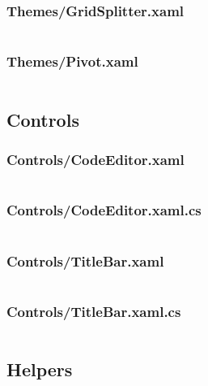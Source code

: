 \documentclass[a4paper]{report}
\begin{document}
\inputminted{xml}{"../src/Algorithm Dynamics/Themes/FlyoutPresenter.xaml"}

\subsubsection{Themes/GridSplitter.xaml}

\inputminted{xml}{"../src/Algorithm Dynamics/Themes/GridSplitter.xaml"}

\subsubsection{Themes/Pivot.xaml}

\inputminted{xml}{"../src/Algorithm Dynamics/Themes/Pivot.xaml"}

\subsection{Controls}

\subsubsection{Controls/CodeEditor.xaml}

\inputminted{xml}{"../src/Algorithm Dynamics/Controls/CodeEditor.xaml"}

\subsubsection{Controls/CodeEditor.xaml.cs}

\inputminted{csharp}{"../src/Algorithm Dynamics/Controls/CodeEditor.xaml.cs"}

\subsubsection{Controls/TitleBar.xaml}

\inputminted{xml}{"../src/Algorithm Dynamics/Controls/TitleBar.xaml"}

\subsubsection{Controls/TitleBar.xaml.cs}

\inputminted{csharp}{"../src/Algorithm Dynamics/Controls/TitleBar.xaml.cs"}

\subsection{Helpers}
\end{document}

